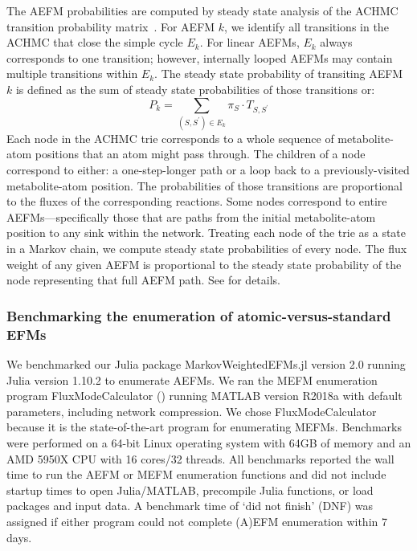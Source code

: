 \documentclass[12pt]{article}
\begin{document}
The AEFM probabilities are computed by steady state analysis of the ACHMC
transition probability matrix~\citep{ChitpinJustinG2023AMct}. For AEFM
$k$, we identify all transitions in the ACHMC that close the simple cycle
$E_k$. For linear AEFMs, $E_k$ always corresponds to one transition;
however, internally looped AEFMs may contain multiple transitions within
$E_k$. The steady state probability of transiting AEFM $k$ is defined as
the sum of steady state probabilities of those transitions or:
%
\begin{equation}
    P_k = \sum_{(S,S^\prime) \in E_k} \pi_S \cdot T_{S, S^\prime}
\end{equation}
%
Each node in the ACHMC trie corresponds to a whole sequence of
metabolite-atom positions that an atom might pass through. The children of
a node correspond to either: a one-step-longer path or a loop back to
a previously-visited metabolite-atom position. The probabilities of those
transitions are proportional to the fluxes of the corresponding reactions.
Some nodes correspond to entire AEFMs---specifically those that are paths
from the initial metabolite-atom position to any sink within the network.
Treating each node of the trie as a state in a Markov chain, we compute
steady state probabilities of every node. The flux weight of any given
AEFM is proportional to the steady state probability of the node representing
that full AEFM path. See \citeauthor{ChitpinJustinG2023AMct}
for details.

\subsubsection*{Benchmarking the enumeration of atomic-versus-standard EFMs}

We benchmarked our Julia package MarkovWeightedEFMs.jl version 2.0 running
Julia version 1.10.2 to enumerate AEFMs. We ran the MEFM
enumeration program FluxModeCalculator (\cite{vanKlinkenJanBert2016Faet})
running MATLAB version R2018a with default parameters, including network
compression. We chose FluxModeCalculator because it is the
state-of-the-art program for enumerating MEFMs. Benchmarks were
performed on a 64-bit Linux operating system with 64GB of memory and an
AMD 5950X CPU with 16 cores/32 threads. All benchmarks reported the wall
time to run the AEFM or MEFM enumeration functions and did not
include startup times to open Julia/MATLAB, precompile Julia functions, or
load packages and input data. A benchmark time of `did not finish' (DNF)
was assigned if either program could not complete (A)EFM enumeration
within 7 days.
\end{document}
